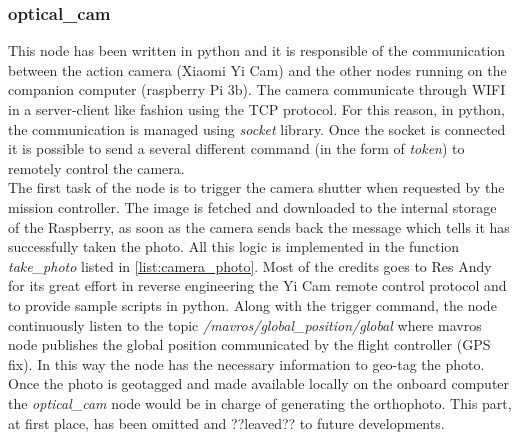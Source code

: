 \subsubsection{optical\_cam} %
\label{ssub:optical_cam}
This node has been written in python and it is responsible of the communication between the action camera (Xiaomi Yi Cam) and the other nodes running on the companion computer (raspberry Pi 3b). The camera communicate through WIFI in a server-client like fashion using the TCP protocol. For this reason, in python, the communication is managed using \textit{socket} library.
Once the socket is connected it is possible to send a several different command (in the form of \textit{token}) to remotely control the camera.\\
The first task of the node is to trigger the camera shutter when requested by the mission controller. The image is fetched and downloaded to the internal storage of the Raspberry, as soon as the camera sends back the message which tells it has successfully taken the photo. All this logic is implemented in the function \textit{take\_photo} listed in \autoref{list:camera_photo}. Most of the credits goes to Res Andy for its great effort in reverse engineering the Yi Cam remote control protocol and to provide sample scripts in python. \cite{YiCamGit}
Along with the trigger command, the node continuously listen to the topic \textit{/mavros/global\_position/global} where mavros node publishes the global position communicated by the flight controller (GPS fix). In this way the node has the necessary information to geo-tag the photo.
Once the photo is geotagged and made available locally on the onboard computer the \textit{optical\_cam} node would be in charge of generating the orthophoto. This part, at first place, has been omitted and ??leaved?? to future developments.
\pagebreak


